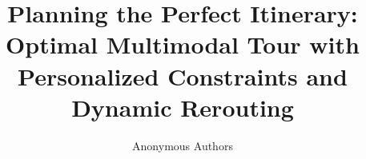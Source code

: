\documentclass[sigconf,authordraft]{acmart}
\newcommand{\ignore}[1]{}
\begin{document}
\title[Planning the Perfect Itinerary]{Planning the Perfect Itinerary: Optimal Multimodal Tour with  Personalized Constraints and Dynamic Rerouting}


\ignore{
\author{Neelu Lalchandani}
\affiliation{%
  \institution{Dept. of Computer Science and Engineering}
  \city{IIT Kanpur}
  \country{India}
  \email{@iitk.ac.in}
}

\author{Priyanshu Jha}
\affiliation{%
  \institution{Dept. of Computer Science and Engineering}
  \city{IIT Kanpur}
  \country{India}
  \email{@iitk.ac.in}
}

\author{Shubhadip Mitra}
\affiliation{%
  \institution{Blue Yonder India Pvt. Ltd.}
  \city{Bengaluru}
  \country{India}
  \email{shubhadip.mitra@blueyonder.com}
}



\author{Arindam Pal}
\affiliation{%
  \institution{TechSoftX Corporation}
  \city{Sydney}
  \state{NSW}
  \country{Australia}
  \email{arindamp@techsoftx.com.au}
}

\author{Oswald Christopher}
\affiliation{%
  \institution{Dept. of Computer Science and Engineering}
  \city{NIT Tiruchirappalli}
  \country{India}
  \email{oswald@nitt.edu}
}

\author{Arnab Bhattacharya}
\affiliation{%
  \institution{Dept. of Computer Science and Engineering}
  \city{IIT Kanpur}
  \country{India}
  \email{arnabb@iitk.ac.in}
}
}

\author{Anonymous Authors}

\end{document}

